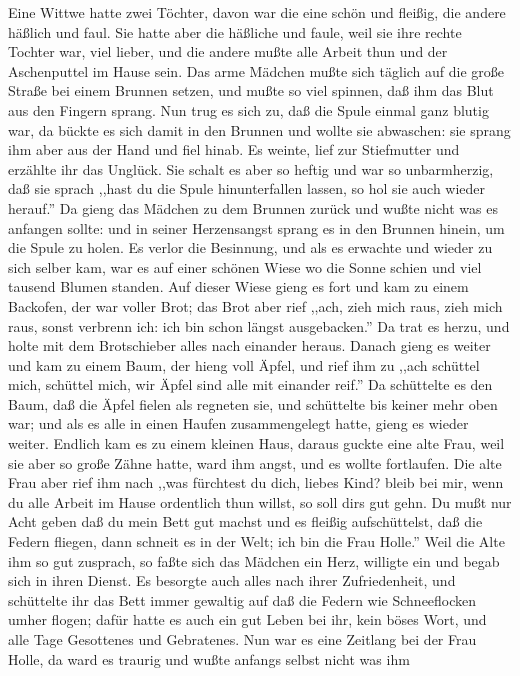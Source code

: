 \documentclass[10pt,a4paper]{article}
\begin{document}
\vskip 4pt
Eine Wittwe hatte zwei Töchter, davon war die eine schön und fleißig, die andere
häßlich und faul. Sie hatte aber die häßliche und faule, weil sie ihre rechte
Tochter war, viel lieber, und die andere mußte alle Arbeit thun und der
Aschenputtel im Hause sein. Das arme Mädchen mußte sich täglich auf die große
Straße bei einem Brunnen setzen, und mußte so viel spinnen, daß ihm das Blut aus
den Fingern sprang. Nun trug es sich zu, daß die Spule einmal ganz blutig war,
da bückte es sich damit in den Brunnen und wollte sie abwaschen: sie sprang ihm
aber aus der Hand und fiel hinab. Es weinte, lief zur Stiefmutter und erzählte
ihr das Unglück. Sie schalt es aber so heftig und war so unbarmherzig, daß sie
sprach ,,hast du die Spule hinunterfallen lassen, so hol sie auch wieder herauf.''
Da gieng das Mädchen zu dem Brunnen zurück und wußte nicht was es anfangen
sollte: und in seiner Herzensangst sprang es in den Brunnen hinein, um die Spule
zu holen. Es verlor die Besinnung, und als es erwachte und wieder zu sich selber
kam, war es auf einer schönen Wiese wo die Sonne schien und viel tausend Blumen
standen. Auf dieser Wiese gieng es fort und kam zu einem Backofen, der war
voller Brot; das Brot aber rief ,,ach, zieh mich raus, zieh mich raus, sonst
verbrenn ich: ich bin schon längst ausgebacken.'' Da trat es herzu, und holte
mit dem Brotschieber alles nach einander heraus. Danach gieng es weiter und kam
zu einem Baum, der hieng voll Äpfel, und rief ihm zu ,,ach schüttel mich,
schüttel mich, wir Äpfel sind alle mit einander reif.'' Da schüttelte es den
Baum, daß die Äpfel fielen als regneten sie, und schüttelte bis keiner mehr oben
war; und als es alle in einen Haufen zusammengelegt hatte, gieng es wieder
weiter. Endlich kam es zu einem kleinen Haus, daraus guckte eine alte Frau,
weil sie aber so große Zähne hatte, ward ihm angst, und es wollte fortlaufen.
Die alte Frau aber rief ihm nach ,,was fürchtest du dich, liebes Kind? bleib bei
mir, wenn du alle Arbeit im Hause ordentlich thun willst, so soll dirs gut gehn.
Du mußt nur Acht geben daß du mein Bett gut machst und es fleißig aufschüttelst,
daß die Federn fliegen, dann schneit es in der Welt; ich bin die Frau Holle.''
Weil die Alte ihm so gut zusprach, so faßte sich das Mädchen ein Herz, willigte
ein und begab sich in ihren Dienst. Es besorgte auch alles nach ihrer
Zufriedenheit, und schüttelte ihr das Bett immer gewaltig auf daß die Federn wie
Schneeflocken umher flogen; dafür hatte es auch ein gut Leben bei ihr, kein
böses Wort, und alle Tage Gesottenes und Gebratenes. Nun war es eine Zeitlang
bei der Frau Holle, da ward es traurig und wußte anfangs selbst nicht was ihm
\end{document}
